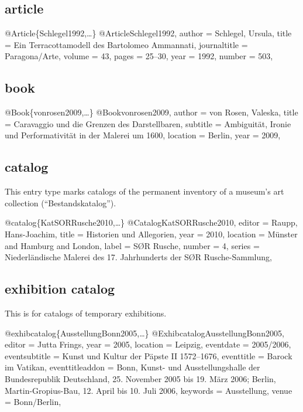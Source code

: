 \documentclass[a4paper,
10pt,
ngerman,
english
]{ltxdoc}
\begin{document}
\subsection{article}
\begin{bibexample}[label=Schlegel1992]{{@}Article\{Schlegel1992,…\}}
@Article{Schlegel1992,
  author       = {Schlegel, Ursula},
  title        = {Ein Terracottamodell des Bartolomeo Ammannati},
  journaltitle = {Paragona/Arte},
  volume       = {43},
  pages        = {25--30},
  year         = {1992},
  number       = {503},
}
\end{bibexample}


\subsection{book}
\begin{bibexample}[label=vonrosen2009]{{@}Book\{vonrosen2009,…\}}
@Book{vonrosen2009,
  author   = {von Rosen, Valeska},
  title    = {Caravaggio und die Grenzen des Darstellbaren},
  subtitle = {Ambiguität, Ironie und Performativität in der Malerei um 1600},
  location = {Berlin},
  year     = {2009},
}
\end{bibexample}

\subsection{catalog}
This entry type marks catalogs of the permanent inventory of a museum's art collection (\enquote{Bestandskatalog}).
\begin{bibexample}[label=KatSORRusche2010]{{@}catalog\{KatSORRusche2010,…\}}
@Catalog{KatSORRusche2010,
  editor   = {Raupp, Hans-Joachim},
  title    = {Historien und Allegorien},
  year     = {2010},
  location = {Münster and Hamburg and London},
  label    = {S{{\O}}R Rusche},
  number   = {4},
  series   = {Niederländische Malerei des 17. Jahrhunderts der S{{\O}}R Rusche-Sammlung},
}
\end{bibexample}

\subsection{exhibition catalog}
This is for catalogs of temporary exhibitions.
\begin{bibexample}[label=AusstellungBonn2005]{{@}exhibcatalog\{AusstellungBonn2005,…\}}
@Exhibcatalog{AusstellungBonn2005,
  editor          = {Jutta Frings},
  year            = {2005},
  location        = {Leipzig},
  eventdate       = {2005/2006},
  eventsubtitle   = {Kunst und Kultur der Päpste II 1572--1676},
  eventtitle      = {Barock im Vatikan},
  eventtitleaddon = {Bonn, Kunst- und Ausstellungshalle der Bundesrepublik Deutschland, 25. November 2005 bis 19. März 2006; Berlin, Martin-Gropius-Bau, 12. April bis 10. Juli 2006},
  keywords        = {Ausstellung},
  venue           = {Bonn/Berlin},
}
\end{bibexample}
\end{document}

